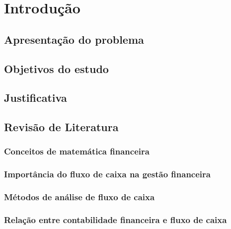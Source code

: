 \chapter{Introdução}\label{chp:introduction}
\thispagestyle{headings}
 
\section{Apresentação do problema}
\section{Objetivos do estudo}
\section{Justificativa}

\section{Revisão de Literatura}

\subsection{Conceitos de matemática financeira}
\subsection{Importância do fluxo de caixa na gestão financeira}
\subsection{Métodos de análise de fluxo de caixa}
\subsection{Relação entre contabilidade financeira e fluxo de caixa}